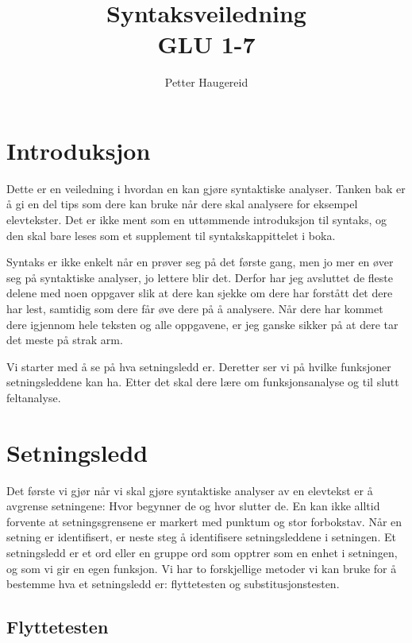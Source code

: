 \documentclass{article}
\title{Syntaksveiledning\\GLU 1-7}
\author{Petter Haugereid}
\date{}
\begin{document}
\maketitle


\section{Introduksjon}

Dette er en veiledning i hvordan en kan gj{\o}re syntaktiske analyser. Tanken bak er {\aa} gi en del tips som dere kan bruke n{\aa}r dere skal analysere for eksempel elevtekster. Det er ikke ment som en utt{\o}mmende introduksjon til syntaks, og den skal bare leses som et supplement til syntakskappittelet i boka.

Syntaks er ikke enkelt n{\aa}r en pr{\o}ver seg p{\aa} det f{\o}rste gang, men jo mer en {\o}ver seg p{\aa} syntaktiske analyser, jo lettere blir det. Derfor har jeg avsluttet de fleste delene med noen oppgaver slik at dere kan sjekke om dere har forst{\aa}tt det dere har lest, samtidig som dere f{\aa}r {\o}ve dere p{\aa} {\aa} analysere. N{\aa}r dere har kommet dere igjennom hele teksten og alle oppgavene, er jeg ganske sikker p{\aa} at dere tar det meste p{\aa} strak arm.

Vi starter med {\aa} se p{\aa} hva setningsledd er. Deretter ser vi p{\aa} hvilke funksjoner setningsleddene kan ha. Etter det skal dere l{\ae}re om funksjonsanalyse og til slutt feltanalyse.

\section{Setningsledd}

Det f{\o}rste vi gj{\o}r n{\aa}r vi skal gj{\o}re syntaktiske analyser av en elevtekst er {\aa} avgrense setningene: Hvor begynner de og hvor slutter de. En kan ikke alltid forvente at setningsgrensene er markert med punktum og stor forbokstav. N{\aa}r en setning er identifisert, er neste steg {\aa} identifisere setningsleddene i setningen. Et setningsledd er et ord eller en gruppe ord som opptrer som en enhet i setningen, og som vi gir en egen funksjon. Vi har to forskjellige metoder vi kan bruke for {\aa} bestemme hva et setningsledd er: flyttetesten og substitusjonstesten.

\subsection{Flyttetesten}\label{sec:permutasjon}
\end{document}
